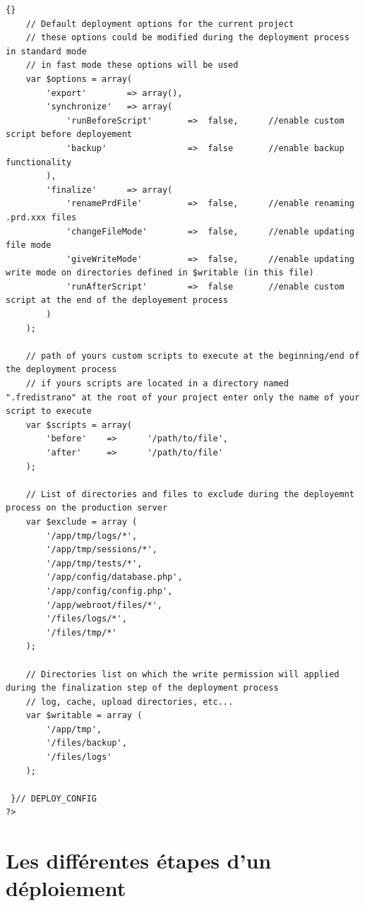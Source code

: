 \documentclass[12pt,a4paper]{report}
\begin{document}
\begin{itemize}
\begin{lstlisting}[frame=tb]{}
	// Default deployment options for the current project
	// these options could be modified during the deployment process in standard mode
	// in fast mode these options will be used
 	var $options = array(
 		'export' 		=> array(),
 		'synchronize'	=> array(
 		 	'runBeforeScript'		=> 	false, 		//enable custom script before deployement 
 			'backup'				=> 	false 		//enable backup functionality
 		),
 		'finalize'		=> array(
	 		'renamePrdFile' 		=> 	false,		//enable renaming .prd.xxx files
			'changeFileMode' 		=> 	false,		//enable updating file mode
			'giveWriteMode'			=> 	false,		//enable updating write mode on directories defined in $writable (in this file)
 			'runAfterScript'		=> 	false		//enable custom script at the end of the deployement process
 		)
 	);
 	
 	// path of yours custom scripts to execute at the beginning/end of the deployment process
	// if yours scripts are located in a directory named ".fredistrano" at the root of your project enter only the name of your script to execute
 	var $scripts = array(
 		'before' 	=>		'/path/to/file', 
 		'after' 	=>		'/path/to/file' 
 	);
 	
	// List of directories and files to exclude during the deployemnt process on the production server
	var $exclude = array (
		'/app/tmp/logs/*',
		'/app/tmp/sessions/*',
		'/app/tmp/tests/*',
		'/app/config/database.php',
		'/app/config/config.php',
		'/app/webroot/files/*',
		'/files/logs/*',
		'/files/tmp/*'
	);
		
	// Directories list on which the write permission will applied during the finalization step of the deployment process	
	// log, cache, upload directories, etc...
	var $writable = array (
		'/app/tmp',
		'/files/backup',
		'/files/logs'
	);

 }// DEPLOY_CONFIG
?>
\end{lstlisting}

\end{itemize}
\newpage

\section{Les différentes étapes d'un déploiement }
\end{document}

